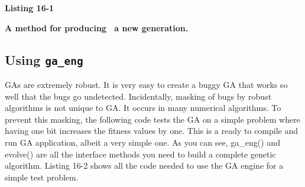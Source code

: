 \bigskip

{\sffamily\bfseries
Listing 16-1}

{\sffamily\bfseries
A method for producing \ a new generation.}


\subsection{Using \texttt{ga\_eng}}

GAs are extremely robust. It is very easy to create a buggy GA that
works so well that the bugs go undetected. Incidentally, masking of
bugs by robust algorithms is not unique to GA. It occurs in many
numerical algorithms. To prevent this masking, the following code tests
the GA on a simple problem where having one bit increases the fitness
values by one. This is a ready to compile and run GA application,
albeit a very simple one. As you can see, \textsf{ga\_eng()} and
\textsf{evolve()} are all the interface methods you need to build a
complete genetic algorithm. Listing 16-2 shows all the code needed
to use the GA engine for a simple test problem.


